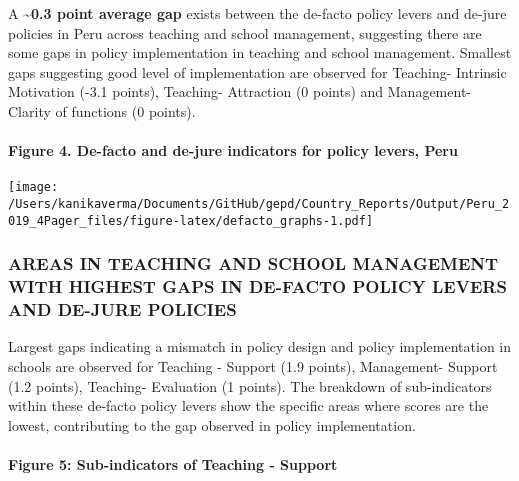 \documentclass[twocolumn]{article}
\let\oldparagraph\paragraph
\renewcommand{\paragraph}[1]{\oldparagraph{#1}\mbox{}}
\begin{document}
A \textasciitilde{}\textbf{0.3 point average gap} exists between the
de-facto policy levers and de-jure policies in Peru across teaching and
school management, suggesting there are some gaps in policy
implementation in teaching and school management. Smallest gaps
suggesting good level of implementation are observed for Teaching-
Intrinsic Motivation (-3.1 points), Teaching- Attraction (0 points) and
Management-Clarity of functions (0 points).

\hypertarget{figure-4.-de-facto-and-de-jure-indicators-for-policy-levers-peru}{%
\paragraph{Figure 4. De-facto and de-jure indicators for policy levers,
Peru}\label{figure-4.-de-facto-and-de-jure-indicators-for-policy-levers-peru}}

\texttt{[image: /Users/kanikaverma/Documents/GitHub/gepd/Country\_Reports/Output/Peru\_2019\_4Pager\_files/figure-latex/defacto\_graphs-1.pdf]}

\hypertarget{areas-in-teaching-and-school-management-with-highest-gaps-in-de-facto-policy-levers-and-de-jure-policies}{%
\subsubsection{\texorpdfstring{\textbf{AREAS IN TEACHING AND SCHOOL
MANAGEMENT WITH HIGHEST GAPS IN DE-FACTO POLICY LEVERS AND DE-JURE
POLICIES}}{AREAS IN TEACHING AND SCHOOL MANAGEMENT WITH HIGHEST GAPS IN DE-FACTO POLICY LEVERS AND DE-JURE POLICIES}}\label{areas-in-teaching-and-school-management-with-highest-gaps-in-de-facto-policy-levers-and-de-jure-policies}}

Largest gaps indicating a mismatch in policy design and policy
implementation in schools are observed for Teaching - Support (1.9
points), Management- Support (1.2 points), Teaching- Evaluation (1
points). The breakdown of sub-indicators within these de-facto policy
levers show the specific areas where scores are the lowest, contributing
to the gap observed in policy implementation. \vfill\null

\hypertarget{figure-5-sub-indicators-of-teaching---support}{%
\paragraph{Figure 5: Sub-indicators of Teaching -
Support}\label{figure-5-sub-indicators-of-teaching---support}}
\end{document}
